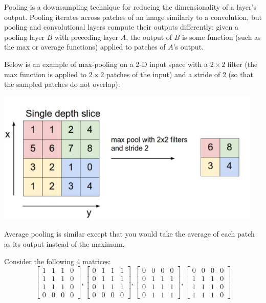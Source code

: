 Pooling is a downsampling technique for reducing the dimensionality of a layer's output. Pooling iterates across patches of an image similarly to a convolution, but pooling and convolutional layers compute their outputs differently: given a pooling layer $B$ with preceding layer $A$, the output of $B$ is some function (such as the max or average functions) applied to patches of $A$'s output.

Below is an example of max-pooling on a 2-D input space with a $2\times 2$ filter (the max function is applied to $2\times 2$ patches of the input) and a stride of 2 (so that the sampled patches do not overlap):

\begin{center}
  \includegraphics[width=.49\textwidth]{Plots/MaxPool.png}
\end{center}

Average pooling is similar except that you would take the average of each patch as its output instead of the maximum.

Consider the following 4 matrices:
$$
\begin{bmatrix}
    1 & 1 & 1 & 0 \\
    1 & 1 & 1 & 0 \\
    1 & 1 & 1 & 0 \\
    0 & 0 & 0 & 0
\end{bmatrix},
%
\begin{bmatrix}
    0 & 1 & 1 & 1 \\
    0 & 1 & 1 & 1 \\
    0 & 1 & 1 & 1 \\
    0 & 0 & 0 & 0
\end{bmatrix},
%
\begin{bmatrix}
	0 & 0 & 0 & 0 \\
    0 & 1 & 1 & 1 \\
    0 & 1 & 1 & 1 \\
    0 & 1 & 1 & 1
\end{bmatrix},
%
\begin{bmatrix}
    0 & 0 & 0 & 0 \\
    1 & 1 & 1 & 0 \\
    1 & 1 & 1 & 0 \\
    1 & 1 & 1 & 0
\end{bmatrix}
$$
\problem[3]

